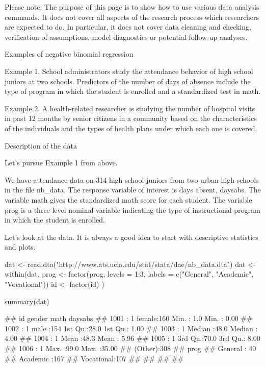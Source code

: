 Please note: The purpose of this page is to show how to use various data analysis commands. It does not cover all aspects of the research process which researchers are expected to do. In particular, it does not cover data cleaning and checking, verification of assumptions, model diagnostics or potential follow-up analyses.

Examples of negative binomial regression

Example 1. School administrators study the attendance behavior of high school juniors at two schools. Predictors of the number of days of absence include the type of program in which the student is enrolled and a standardized test in math. 

Example 2. A health-related researcher is studying the number of hospital visits in past 12 months by senior citizens in a community based on the characteristics of the individuals and the types of health plans under which each one is covered.

Description of the data

Let's pursue Example 1 from above.

We have attendance data on 314 high school juniors from two urban high schools in the file nb_data. The response variable of interest is days absent, daysabs. The variable math gives the standardized math score for each student. The variable prog is a three-level nominal variable indicating the type of instructional program in which the student is enrolled.

Let's look at the data. It is always a good idea to start with descriptive statistics and plots.



dat <- read.dta("http://www.ats.ucla.edu/stat/stata/dae/nb_data.dta")
dat <- within(dat, {
	prog <- factor(prog, levels = 1:3, labels = c("General", "Academic", "Vocational"))
	id <- factor(id)
})

summary(dat)

##        id         gender         math         daysabs     
##  1001   :  1   female:160   Min.   : 1.0   Min.   : 0.00  
##  1002   :  1   male  :154   1st Qu.:28.0   1st Qu.: 1.00  
##  1003   :  1                Median :48.0   Median : 4.00  
##  1004   :  1                Mean   :48.3   Mean   : 5.96  
##  1005   :  1                3rd Qu.:70.0   3rd Qu.: 8.00  
##  1006   :  1                Max.   :99.0   Max.   :35.00  
##  (Other):308                                              
##          prog    
##  General   : 40  
##  Academic  :167  
##  Vocational:107  
##                  
##                  
##                  
## 


